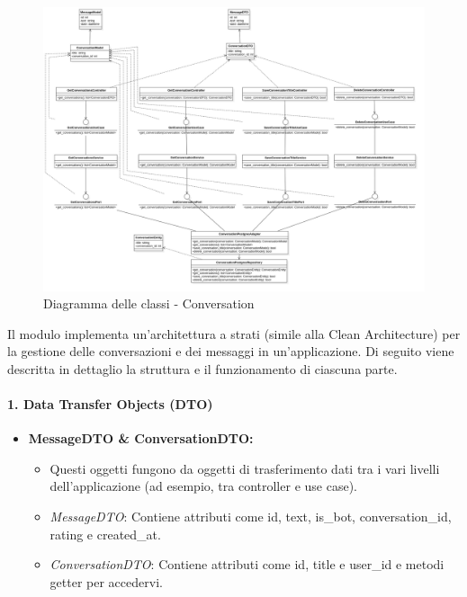     \begin{figure}[H]
        \centering
        \includegraphics[width=\linewidth, height=0.8\textheight, keepaspectratio]{./img/png/Model3!Conversation_3.png}
        \caption{Diagramma delle classi - Conversation}
        \label{fig:conversation}
    \end{figure}

    Il modulo implementa un'architettura a strati (simile alla Clean Architecture) per la gestione delle conversazioni e dei messaggi in un'applicazione. Di seguito viene descritta in dettaglio la struttura e il funzionamento di ciascuna parte.

    \paragraph{1. Data Transfer Objects (DTO)}
    \begin{itemize}
        \item \textbf{MessageDTO \& ConversationDTO:}
        \begin{itemize}
            \item Questi oggetti fungono da oggetti di trasferimento dati tra i vari livelli dell'applicazione (ad esempio, tra controller e use case).
            \item \textit{MessageDTO}: Contiene attributi come id, text, is\_bot, conversation\_id, rating e created\_at.
            \item \textit{ConversationDTO}: Contiene attributi come id, title e user\_id e metodi getter per accedervi.
        \end{itemize}
    \end{itemize}

